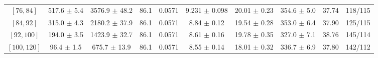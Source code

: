 \begin{tabular}{c||c|c|c|c|c|c|c||c|c}
$[76, 84]$ & 517.6 $\pm$ 5.4 & 3576.9 $\pm$ 48.2 & 86.1 & 0.0571 & 9.231 $\pm$ 0.098 & 20.01 $\pm$ 0.23 & 354.6 $\pm$ 5.0 & 37.74 & 118/115\\
$[84, 92]$ & 315.0 $\pm$ 4.3 & 2180.2 $\pm$ 37.9 & 86.1 & 0.0571 & 8.84 $\pm$ 0.12 & 19.54 $\pm$ 0.28 & 353.0 $\pm$ 6.4 & 37.90 & 125/115\\
$[92, 100]$ & 194.0 $\pm$ 3.5 & 1423.9 $\pm$ 32.7 & 86.1 & 0.0571 & 8.61 $\pm$ 0.16 & 19.78 $\pm$ 0.35 & 327.0 $\pm$ 7.1 & 38.76 & 145/114\\
$[100, 120]$ & 96.4 $\pm$ 1.5 & 675.7 $\pm$ 13.9 & 86.1 & 0.0571 & 8.55 $\pm$ 0.14 & 18.01 $\pm$ 0.32 & 336.7 $\pm$ 6.9 & 37.80 & 142/112\\
\end{tabular}

